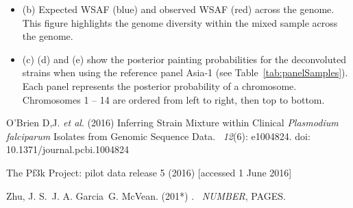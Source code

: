 \documentclass{article}
\begin{document}
\begin{itemize}
\item (b) Expected WSAF (blue) and observed WSAF (red) across the genome. This figure highlights the genome diversity within the mixed sample across the genome.

\item (c) (d) and (e) show the posterior painting probabilities for the deconvoluted strains when using the reference panel Asia-1 (see Table~\ref{tab:panelSamples}). Each panel represents the posterior probability of a chromosome. Chromosomes 1 -- 14 are ordered from left to right, then top to bottom.
\end{itemize}



\begin{thebibliography}{}
O'Brien D,J. {\em et al}. (2016)
\newblock Inferring Strain Mixture within Clinical {\em Plasmodium falciparum} Isolates from Genomic Sequence Data. ~{\em 12\/}(6): e1004824. doi: 10.1371/journal.pcbi.1004824


The Pf3k Project: pilot data release 5 (2016)
 [accessed 1 June 2016]


Zhu, J. S.\, J. A. Garcia\, G. McVean. (201*)
.
~{\em NUMBER\/}, PAGES.

\end{thebibliography}
\end{document}
